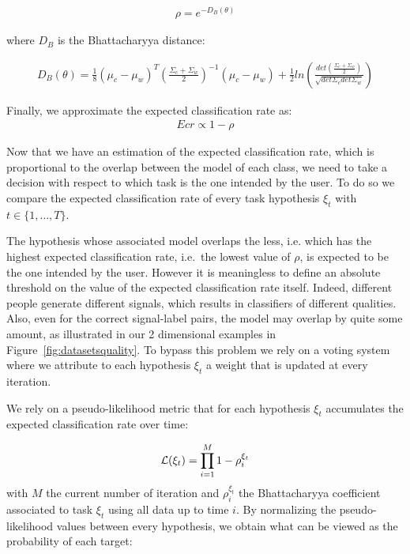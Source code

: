 \begin{eqnarray}
\rho = e^{-D_B(\theta)}
\end{eqnarray}

where $D_B$ is the Bhattacharyya distance:

\begin{eqnarray}
D_B(\theta) = \frac{1}{8}(\mu_c-\mu_w)^T(\frac{\Sigma_c+\Sigma_w}{2})^{-1}(\mu_c-\mu_w)+\frac{1}{2}ln\left(\frac{det(\frac{\Sigma_c+\Sigma_w}{2})}{\sqrt{det\Sigma_c det\Sigma_w}}\right)
\end{eqnarray}

Finally, we approximate the expected classification rate as:
\begin{eqnarray}
Ecr \propto 1 - \rho
\end{eqnarray}

Now that we have an estimation of the expected classification rate, which is proportional to the overlap between the model of each class, we need to take a decision with respect to which task is the one intended by the user. To do so we compare the expected classification rate of every task hypothesis $\xi_t$ with $t \in \{1, \ldots, T\}$. 

The hypothesis whose associated model overlaps the less, i.e. which has the highest expected classification rate, i.e.\ the lowest value of $\rho$, is expected to be the one intended by the user. However it is meaningless to define an absolute threshold on the value of the expected classification rate itself. Indeed, different people generate different signals, which results in classifiers of different qualities. Also, even for the correct signal-label pairs, the model may overlap by quite some amount, as illustrated in our 2 dimensional examples in Figure~\ref{fig:datasetsquality}. To bypass this problem we rely on a voting system where we attribute to each hypothesis $\xi_t$ a weight that is updated at every iteration.

We rely on a pseudo-likelihood metric that for each hypothesis $\xi_t$ accumulates the expected classification rate over time:

\begin{eqnarray}
\mathcal{L}(\xi_t) = \prod_{i = 1}^{M} 1 - \rho_i^{\xi_t}
\end{eqnarray}
%
with $M$ the current number of iteration and $\rho_i^{\xi_t}$ the Bhattacharyya coefficient associated to task $\xi_t$ using all data up to time $i$. By normalizing the pseudo-likelihood values between every hypothesis, we obtain what can be viewed as the probability of each target:

